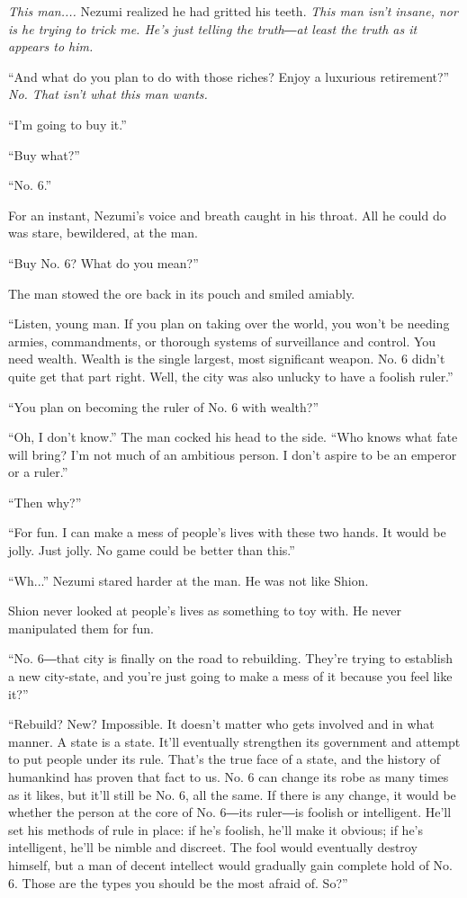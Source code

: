 \emph{This man....} Nezumi realized he had gritted his teeth. \emph{This man isn't
insane, nor is he trying to trick me. He's just telling the truth―at
least the truth as it appears to him.}

``And what do you plan to do with those riches? Enjoy a luxurious
retirement?'' \emph{No. That isn't what this man wants.}

``I'm going to buy it.''

``Buy what?''

``No. 6.''

For an instant, Nezumi's voice and breath caught in his throat. All he
could do was stare, bewildered, at the man.

``Buy No. 6? What do you mean?''

The man stowed the ore back in its pouch and smiled amiably.

``Listen, young man. If you plan on taking over the world, you won't be
needing armies, commandments, or thorough systems of surveillance and
control. You need wealth. Wealth is the single largest, most significant
weapon. No. 6 didn't quite get that part right. Well, the city was also
unlucky to have a foolish ruler.''

``You plan on becoming the ruler of No. 6 with wealth?''

``Oh, I don't know.'' The man cocked his head to the side. ``Who knows
what fate will bring? I'm not much of an ambitious person. I don't
aspire to be an emperor or a ruler.''

``Then why?''

``For fun. I can make a mess of people's lives with these two hands. It
would be jolly. Just jolly. No game could be better than this.''

``Wh...'' Nezumi stared harder at the man. He was not like Shion.~

Shion never looked at people's lives as something to toy with. He never
manipulated them for fun.

``No. 6―that city is finally on the road to rebuilding. They're trying
to establish a new city-state, and you're just going to make a mess of
it because you feel like it?''

``Rebuild? New? Impossible. It doesn't matter who gets involved and in
what manner. A state is a state. It'll eventually strengthen its
government and attempt to put people under its rule. That's the true
face of a state, and the history of humankind has proven that fact to
us. No. 6 can change its robe as many times as it likes, but it'll still
be No. 6, all the same. If there is any change, it would be whether the
person at the core of No. 6―its ruler―is foolish or intelligent. He'll
set his methods of rule in place: if he's foolish, he'll make it
obvious; if he's intelligent, he'll be nimble and discreet. The fool
would eventually destroy himself, but a man of decent intellect would
gradually gain complete hold of No. 6. Those are the types you should be
the most afraid of. So?''

